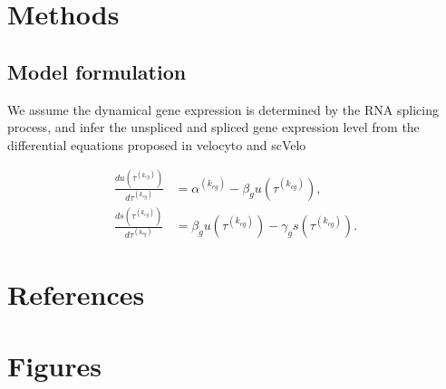 \documentclass[
  sn-mathphys-num,
  lineno,
  twocolumn]{sn-jnl}
\begin{document}
\section{Methods}\label{sec-methods}

\subsection{Model formulation}\label{sec-model}

We assume the dynamical gene expression is determined by the RNA
splicing process, and infer the unspliced and spliced gene expression
level from the differential equations proposed in velocyto
\citep{La_Manno2018-lj} and scVelo \citep{Bergen2020-pj}

\begin{align}
\frac{d u\left(\tau^{\left(k_{cg}\right)}\right)}{d \tau^{\left(k_{cg}\right)}}
  &= \alpha^{\left(k_{cg}\right)}-\beta_g u\left(\tau^{\left(k_{cg}\right)}\right), \label{eq-dudt}\\
\frac{d s\left(\tau^{\left(k_{cg}\right)}\right)}{d \tau^{\left(k_{cg}\right)}}
  &= \beta_g u\left(\tau^{\left(k_{cg}\right)}\right)-\gamma_g s\left(\tau^{\left(k_{cg}\right)}\right). \label{eq-dsdt}
\end{align}

\newpage{}

\onecolumn

\section{References}\label{references}

\renewcommand{\bibsection}{}


\FloatBarrier

\newpage{}

\section{Figures}\label{figures}
\end{document}
